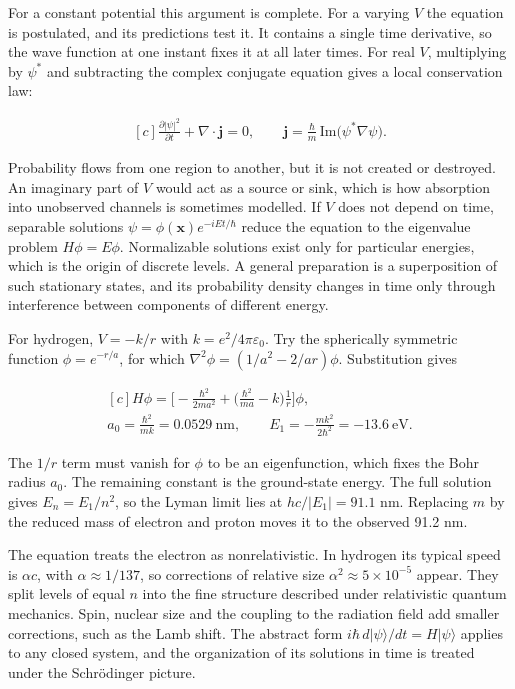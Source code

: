 \documentclass[11pt,oneside]{book}
\newenvironment{centeredalign}{\[\begin{gathered}[c]}{\end{gathered}\]}
\begin{document}
For a constant potential this argument is complete. For a varying \(V\) the equation is postulated, and its predictions test it. It contains a single time derivative, so the wave function at one instant fixes it at all later times. For real \(V\), multiplying by \(\psi^*\) and subtracting the complex conjugate equation gives a local conservation law:

\begin{centeredalign}
\frac{\partial|\psi|^2}{\partial t}+\nabla\cdot\mathbf j=0,\qquad
\mathbf j=\frac{\hbar}{m}\,\mathrm{Im}\big(\psi^*\nabla\psi\big).
\end{centeredalign}

Probability flows from one region to another, but it is not created or destroyed. An imaginary part of \(V\) would act as a source or sink, which is how absorption into unobserved channels is sometimes modelled. If \(V\) does not depend on time, separable solutions \(\psi=\phi(\mathbf x)e^{-iEt/\hbar}\) reduce the equation to the eigenvalue problem \(H\phi=E\phi\). Normalizable solutions exist only for particular energies, which is the origin of discrete levels. A general preparation is a superposition of such stationary states, and its probability density changes in time only through interference between components of different energy.

For hydrogen, \(V=-k/r\) with \(k=e^2/4\pi\varepsilon_0\). Try the spherically symmetric function \(\phi=e^{-r/a}\), for which \(\nabla^2\phi=(1/a^2-2/ar)\phi\). Substitution gives

\begin{centeredalign}
H\phi=\Big[-\frac{\hbar^2}{2ma^2}+\Big(\frac{\hbar^2}{ma}-k\Big)\frac1r\Big]\phi,\\
a_0=\frac{\hbar^2}{mk}=0.0529\ \mathrm{nm},\qquad
E_1=-\frac{mk^2}{2\hbar^2}=-13.6\ \mathrm{eV}.
\end{centeredalign}

The \(1/r\) term must vanish for \(\phi\) to be an eigenfunction, which fixes the Bohr radius \(a_0\). The remaining constant is the ground-state energy. The full solution gives \(E_n=E_1/n^2\), so the Lyman limit lies at \(hc/|E_1|=91.1\) nm. Replacing \(m\) by the reduced mass of electron and proton moves it to the observed 91.2 nm.

The equation treats the electron as nonrelativistic. In hydrogen its typical speed is \(\alpha c\), with \(\alpha\approx1/137\), so corrections of relative size \(\alpha^2\approx5\times10^{-5}\) appear. They split levels of equal \(n\) into the fine structure described under relativistic quantum mechanics. Spin, nuclear size and the coupling to the radiation field add smaller corrections, such as the Lamb shift. The abstract form \(i\hbar\,d|\psi\rangle/dt=H|\psi\rangle\) applies to any closed system, and the organization of its solutions in time is treated under the Schrödinger picture.
\end{document}
